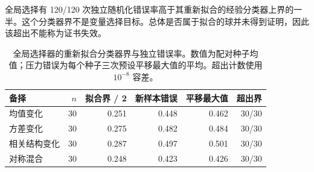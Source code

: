 \documentclass[11pt,a4paper]{article}
\begin{document}
全局选择有 120/120 次独立随机化错误率高于其重新拟合的经验分类器上界的一半。这个分类器界不是变量选择目标。总体是否属于拟合的球并未得到证明，因此该超出不能称为证书失效。
\begin{table}[tbp]\centering\small\setlength{\tabcolsep}{3.5pt}
\caption{全局选择器的重新拟合分类器界与独立错误率。数值为配对种子均值；压力错误为每个种子三次预设平移最大值的平均。超出计数使用 $10^{-8}$ 容差。}\label{tab:head}
\begin{tabularx}{\linewidth}{@{}p{22mm}rrrrr@{}}
\toprule 备择 & $n$ & 拟合界 / 2 & 新样本错误 & 平移最大值 & 超出界 \\
\midrule
均值变化 & 30 & 0.251 & 0.448 & 0.462 & 30/30 \\
方差变化 & 30 & 0.275 & 0.482 & 0.484 & 30/30 \\
相关结构变化 & 30 & 0.287 & 0.497 & 0.501 & 30/30 \\
对称混合 & 30 & 0.248 & 0.423 & 0.426 & 30/30 \\
\bottomrule\end{tabularx}\end{table}
\end{document}

